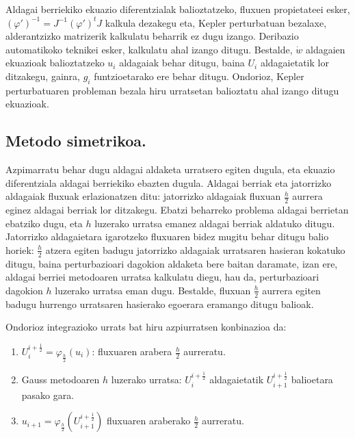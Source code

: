 Aldagai berriekiko ekuazio diferentzialak balioztatzeko, fluxuen propietateei esker,$(\varphi')^{-1}=J^{-1}(\varphi')^tJ$ kalkula dezakegu eta, Kepler perturbatuan bezalaxe, alderantzizko matrizerik kalkulatu beharrik ez dugu izango. Deribazio automatikoko teknikei esker, kalkulatu ahal izango ditugu. Bestalde, $\dot{w}$ aldagaien ekuazioak balioztatzeko $u_i$ aldagaiak behar ditugu, baina $U_i$ aldagaietatik lor ditzakegu, gainra, $g_i$ funtzioetarako ere behar ditugu. Ondorioz, Kepler perturbatuaren probleman bezala hiru urratsetan balioztatu ahal izango ditugu ekuazioak.



\subsection*{Metodo simetrikoa.}

Azpimarratu behar dugu aldagai aldaketa urratsero egiten dugula, eta ekuazio diferentziala aldagai berriekiko ebazten dugula. Aldagai berriak eta jatorrizko aldagaiak fluxuak erlazionatzen ditu: jatorrizko aldagaiak fluxuan $\frac{h}{2}$ aurrera eginez aldagai berriak lor ditzakegu. Ebatzi beharreko problema aldagai berrietan ebatziko dugu, eta $h$ luzerako urratsa emanez aldagai berriak aldatuko ditugu. Jatorrizko aldagaietara igarotzeko fluxuaren bidez mugitu behar ditugu balio horiek: $\frac{h}{2}$ atzera egiten badugu jatorrizko aldagaiak urratsaren hasieran kokatuko ditugu, baina perturbazioari dagokion aldaketa bere baitan daramate, izan ere, aldagai berriei metodoaren urratsa kalkulatu diegu, hau da, perturbazioari dagokion $h$ luzerako urratsa eman dugu. Bestalde, fluxuan $\frac{h}{2}$ aurrera egiten badugu hurrengo urratsaren hasierako egoerara eramango ditugu balioak.

Ondorioz integrazioko urrats bat hiru azpiurratsen konbinazioa da:
\begin{enumerate}
\item $U_i^{i+\frac{1}{2}}=\varphi_{\frac{h}{2}}(u_i)$: fluxuaren arabera $\frac{h}{2}$ aurreratu.
\item Gauss metodoaren $h$ luzerako urratsa: $U_i^{i+\frac{1}{2}}$ aldagaietatik  $U_{i+1}^{i+\frac{1}{2}}$ balioetara pasako gara.
\item $u_{i+1}=\varphi_{\frac{h}{2}}(U_{i+1}^{i+\frac{1}{2}})$ fluxuaren araberako $\frac{h}{2}$ aurreratu.
\end{enumerate}

